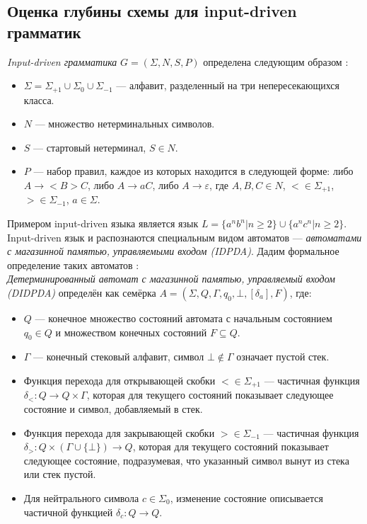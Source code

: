 \subsection{Оценка глубины схемы для input-driven грамматик}
\textit{Input-driven грамматика} $G = ( \Sigma, N, S, P)$ определена следующим образом \cite{IDGrammar}:
\begin{itemize}
	\item $\Sigma = \Sigma_{+1} \cup \Sigma_0 \cup \Sigma_{-1}$ --- алфавит, разделенный на три непересекающихся класса.
	\item $N$ --- множество нетерминальных символов.
         \item $S$ --- стартовый нетерминал, $S \in N$.
	\item $P$ --- набор правил, каждое из которых находится в следующей форме: либо $A \rightarrow <B>C$, либо $A \rightarrow aC$, либо $A \rightarrow \varepsilon$,  где $A, B, C \in N$,  $< \in \Sigma_{+1}$, $> \in  \Sigma_{-1}$, $a \in \Sigma$.
\end{itemize}
Примером input-driven языка является язык $L = \{a^nb^n | n \ge 2\} \cup \{a^nc^n | n \ge 2\}$.
\\Input-driven язык и распознаются специальным видом автоматов --- \textit{автоматами с магазинной памятью, управляемыми входом (IDPDA)}. Дадим формальное определение таких автоматов \cite{OkhotinIDPDA}:
\\
\textit{Детерминированный автомат с магазинной памятью, управляемый входом (DIDPDA)} определён как семёрка $A = (\Sigma, Q, \Gamma, q_0, \bot, [\delta_a], F)$, где:
\begin{itemize}
	\item $Q$ --- конечное множество состояний автомата с начальным состоянием $q_0 \in Q$ и множеством конечных состояний $F  \subseteq Q$.
	\item $\Gamma$ --- конечный стековый алфавит, символ $\bot \not\in \Gamma$ означает пустой стек.
         \item Функция перехода  для открывающей скобки $< \in \Sigma_{+1}$  --- частичная функция $\delta_<: Q \rightarrow Q \times \Gamma$, которая для текущего состояний показывает следующее состояние и символ, добавляемый в стек.
         \item Функция перехода  для закрывающей скобки $> \in \Sigma_{-1}$  --- частичная функция $\delta_>: Q \times (\Gamma \cup \{ \bot \}) \rightarrow Q$, которая для текущего состояний показывает следующее состояние,  подразумевая, что указанный символ вынут из стека или стек пустой.
	\item Для нейтрального символа $c \in \Sigma_0$, изменение состояние описывается частичной функцией $\delta_c: Q \rightarrow Q$.
\end{itemize}
